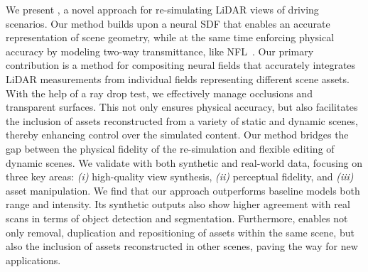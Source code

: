 We present \dynfl, a novel approach for re-simulating LiDAR views of driving scenarios. Our method builds upon a neural SDF that enables an accurate representation of scene geometry, while at the same time enforcing physical accuracy by modeling two-way transmittance, like NFL~\cite{Huang2023nfl}. 
%
Our primary contribution is a method for compositing neural fields that accurately integrates LiDAR measurements from individual fields representing different scene assets. With the help of a ray drop test, we effectively manage occlusions and transparent surfaces. This not only ensures physical accuracy, but also facilitates the inclusion of assets reconstructed from a variety of static and dynamic scenes, thereby enhancing control over the simulated content. Our method bridges the gap between the physical fidelity of the re-simulation and flexible editing of dynamic scenes.
%
We validate \dynfl with both synthetic and real-world data, focusing on three key areas: \textit{(i)} high-quality view synthesis, \textit{(ii)} perceptual fidelity, and \textit{(iii)} asset manipulation. We find that our approach outperforms baseline models \wrt both range and intensity. Its synthetic outputs also show higher agreement with real scans in terms of object detection and segmentation. Furthermore, \dynfl enables not only removal, duplication and repositioning of assets within the same scene, but also the inclusion of assets reconstructed in other scenes, paving the way for new applications.



